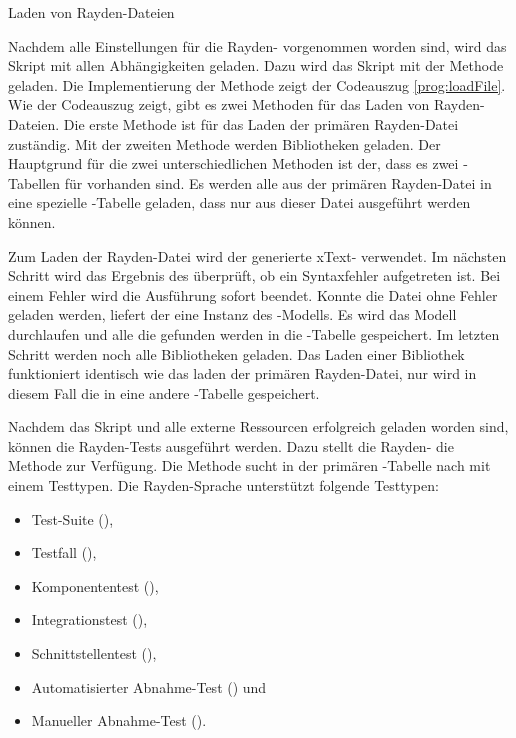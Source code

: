\begin{program}

\caption{Laden von Rayden-Dateien}
\label{prog:loadFile}
\end{program}

\SuperPar
Nachdem alle Einstellungen für die Rayden- vorgenommen worden sind, wird das Skript mit allen Abhängigkeiten geladen. Dazu wird das Skript mit der Methode  geladen. Die Implementierung der Methode zeigt der Codeauszug \ref{prog:loadFile}. Wie der Codeauszug zeigt, gibt es zwei Methoden für das Laden von Rayden-Dateien. Die erste Methode  ist für das Laden der primären Rayden-Datei zuständig. Mit der zweiten Methode  werden Bibliotheken geladen. Der Hauptgrund für die zwei unterschiedlichen Methoden ist der, dass es zwei -Tabellen für  vorhanden sind. Es werden alle  aus der primären Rayden-Datei in eine spezielle -Tabelle geladen, dass nur  aus dieser Datei ausgeführt werden können.

\SuperPar
Zum Laden der Rayden-Datei wird der generierte xText- verwendet. Im nächsten Schritt wird das Ergebnis des  überprüft, ob ein Syntaxfehler aufgetreten ist. Bei einem Fehler wird die Ausführung sofort beendet. Konnte die Datei ohne Fehler geladen werden, liefert der  eine Instanz des -Modells. Es wird das Modell durchlaufen und alle  die gefunden werden in die -Tabelle gespeichert. Im letzten Schritt werden noch alle Bibliotheken geladen. Das Laden einer Bibliothek funktioniert identisch wie das laden der primären Rayden-Datei, nur wird in diesem Fall die  in eine andere -Tabelle gespeichert. 

\SuperPar
Nachdem das Skript und alle externe Ressourcen erfolgreich geladen worden sind, können die Rayden-Tests ausgeführt werden. Dazu stellt die Rayden- die Methode  zur Verfügung. Die Methode sucht in der primären -Tabelle nach  mit einem Testtypen. Die Rayden-Sprache unterstützt folgende Testtypen:

\begin{itemize}
\item Test-Suite (),
\item Testfall (),
\item Komponententest (),
\item Integrationstest (),
\item Schnittstellentest (),
\item Automatisierter Abnahme-Test () und
\item Manueller Abnahme-Test ().
\end{itemize}

